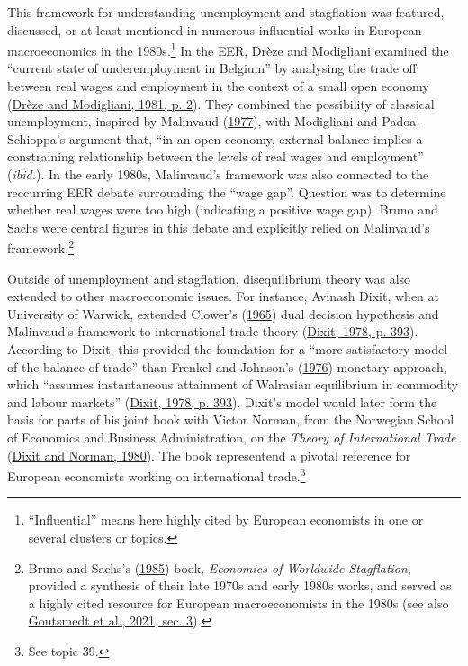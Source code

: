 \documentclass[
  12pt,
  onecolumn]{article}
\begin{document}
This framework for understanding unemployment and stagflation was
featured, discussed, or at least mentioned in numerous influential works
in European macroeconomics in the 1980s.\footnote{``Influential'' means
  here highly cited by European economists in one or several clusters or
  topics.} In the EER, Drèze and Modigliani examined the ``current state
of underemployment in Belgium'' by analysing the trade off between real
wages and employment in the context of a small open economy
(\protect\hyperlink{ref-dreze1981}{Drèze and Modigliani, 1981, p. 2}).
They combined the possibility of classical unemployment, inspired by
Malinvaud (\protect\hyperlink{ref-malinvaud1977}{1977}), with Modigliani
and Padoa-Schioppa's argument that, ``in an open economy, external
balance implies a constraining relationship between the levels of real
wages and employment'' (\emph{ibid.}). In the early 1980s, Malinvaud's
framework was also connected to the reccurring EER debate surrounding
the ``wage gap''. Question was to determine whether real wages were too
high (indicating a positive wage gap). Bruno and Sachs were central
figures in this debate and explicitly relied on Malinvaud's
framework.\footnote{Bruno and Sachs's
  (\protect\hyperlink{ref-brunosachs1985}{1985}) book, \emph{Economics
  of Worldwide Stagflation}, provided a synthesis of their late 1970s
  and early 1980s works, and served as a highly cited resource for
  European macroeconomists in the 1980s (see also
  \protect\hyperlink{ref-goutsmedt2021}{Goutsmedt et al., 2021, sec.
  3}).}

Outside of unemployment and stagflation, disequilibrium theory was also
extended to other macroeconomic issues. For instance, Avinash Dixit,
when at University of Warwick, extended Clower's
(\protect\hyperlink{ref-clower1965}{1965}) dual decision hypothesis and
Malinvaud's framework to international trade theory
(\protect\hyperlink{ref-dixit1978}{Dixit, 1978, p. 393}). According to
Dixit, this provided the foundation for a ``more satisfactory model of
the balance of trade'' than Frenkel and Johnson's
(\protect\hyperlink{ref-frenkel1976}{1976}) monetary approach, which
``assumes instantaneous attainment of Walrasian equilibrium in commodity
and labour markets'' (\protect\hyperlink{ref-dixit1978}{Dixit, 1978, p.
393}). Dixit's model would later form the basis for parts of his joint
book with Victor Norman, from the Norwegian School of Economics and
Business Administration, on the \emph{Theory of International Trade}
(\protect\hyperlink{ref-dixit1980}{Dixit and Norman, 1980}). The book
representend a pivotal reference for European economists working on
international trade.\footnote{See topic 39.}
\end{document}
